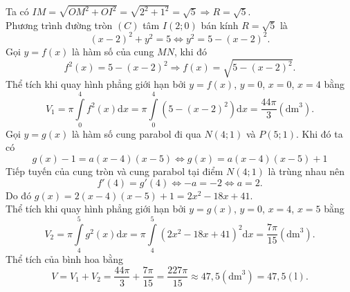 \begin{ex}
{\begin{center}
\begin{tikzpicture}[scale=1.2, >=stealth, font=\footnotesize, line join=round, line cap=round]
\end{tikzpicture}
\end{center}
Ta có $I M=\sqrt{O M^2+O I^2}=\sqrt{2^2+1^2}=\sqrt{5}\Rightarrow R=\sqrt{5}$.\\
Phương trình đường tròn $(C)$ tâm $I(2;0)$ bán kính $R=\sqrt{5}$ là
\[(x-2)^2+y^2=5\Leftrightarrow y^2=5-(x-2)^2.\]
Gọi $y=f(x)$ là hàm số của cung $MN$, khi đó \[f^2(x)=5-(x-2)^2 \Rightarrow f(x)=\sqrt{5-(x-2)^2}.\]
Thể tích khi quay hình phẳng giới hạn bởi $y=f(x)$, $y=0$, $x=0$, $x=4$ bằng
\[V_1=\pi \displaystyle\int\limits_0^4 f^2(x) \mathrm{d}x=\pi \displaystyle\int\limits_0^4\left(5-(x-2)^2\right) \mathrm{d}x=\dfrac{44 \pi}{3}\left(\mathrm{dm}^3\right).\]
Gọi $y=g(x)$ là hàm số cung parabol đi qua $N(4;1)$ và $P(5 ; 1)$. Khi đó ta có
\[g(x)-1=a(x-4)(x-5) \Leftrightarrow  g(x)=a(x-4)(x-5)+1\]
Tiếp tuyến của cung tròn và cung parabol tại điểm $N(4 ; 1)$ là trùng nhau nên
\[f'(4)=g'(4) \Leftrightarrow-a=-2\Leftrightarrow a=2.\]
Do đó $g(x)=2(x-4)(x-5)+1=2 x^2-18 x+41.$\\
Thể tích khi quay hình phẳng giới hạn bởi $y=g(x)$, $y=0$,
$x=4$, $x=5$ bằng
\[V_2=\pi \displaystyle\int\limits_4^5 g^2(x) \mathrm{d}x=\pi \displaystyle\int\limits_4^5\left(2 x^2-18 x+41\right)^2 \mathrm{d}x=\dfrac{7 \pi}{15}\left(\mathrm{dm}^3\right).\]
Thể tích của bình hoa bằng \[V=V_1+V_2=\dfrac{44 \pi}{3}+\dfrac{7 \pi}{15} =\dfrac{227 \pi}{15} \approx 47{,}5\left(\mathrm{d m}^3\right) =47{,}5(\mathrm{l}) .
\]
}
\end{ex}

